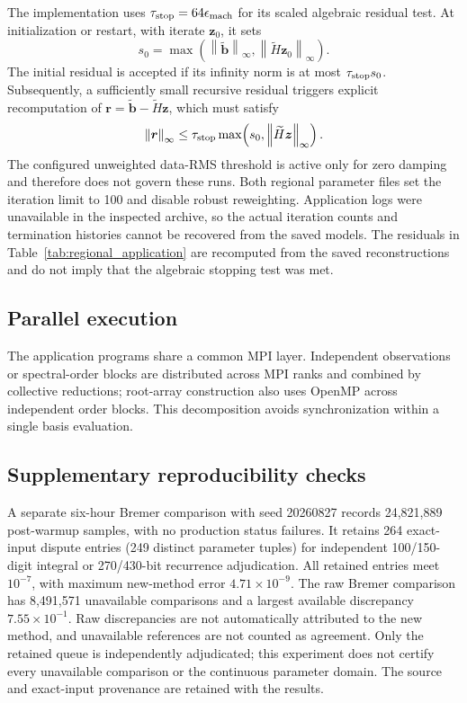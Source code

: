 ﻿\documentclass[11pt,a4paper]{article}
\newcommand{\norm}[1]{\left\lVert#1\right\rVert}
\begin{document}
The implementation uses $\tau_{\rm stop}=64\epsilon_{\rm mach}$ for its scaled algebraic residual test. At initialization or restart, with iterate $\boldsymbol z_0$, it sets
\begin{equation}
 s_0=\max\!\left(\norm{\widetilde{\boldsymbol b}}_\infty,
                 \norm{\widetilde H\boldsymbol z_0}_\infty\right).
\end{equation}
The initial residual is accepted if its infinity norm is at most $\tau_{\rm stop}s_0$. Subsequently, a sufficiently small recursive residual triggers explicit recomputation of $\boldsymbol r=\widetilde{\boldsymbol b}-\widetilde H\boldsymbol z$, which must satisfy
\begin{equation}
 \norm{\boldsymbol r}_\infty\leq
 \tau_{\rm stop}\max\!\left(s_0,\norm{\widetilde H\boldsymbol z}_\infty\right).
 \label{eq:application_stop}
\end{equation}
The configured unweighted data-RMS threshold is active only for zero damping and therefore does not govern these runs. Both regional parameter files set the iteration limit to 100 and disable robust reweighting. Application logs were unavailable in the inspected archive, so the actual iteration counts and termination histories cannot be recovered from the saved models. The residuals in Table~\ref{tab:regional_application} are recomputed from the saved reconstructions and do not imply that the algebraic stopping test was met.

\subsection{Parallel execution}

The application programs share a common MPI layer. Independent observations or spectral-order blocks are distributed across MPI ranks and combined by collective reductions; root-array construction also uses OpenMP across independent order blocks. This decomposition avoids synchronization within a single basis evaluation.

\subsection{Supplementary reproducibility checks}

A separate six-hour Bremer comparison with seed 20260827 records 24,821,889 post-warmup samples, with no production status failures. It retains 264 exact-input dispute entries (249 distinct parameter tuples) for independent 100/150-digit integral or 270/430-bit recurrence adjudication. All retained entries meet $10^{-7}$, with maximum new-method error $4.71\times10^{-9}$. The raw Bremer comparison has 8,491,571 unavailable comparisons and a largest available discrepancy $7.55\times10^{-1}$. Raw discrepancies are not automatically attributed to the new method, and unavailable references are not counted as agreement. Only the retained queue is independently adjudicated; this experiment does not certify every unavailable comparison or the continuous parameter domain. The source and exact-input provenance are retained with the results.
\end{document}
